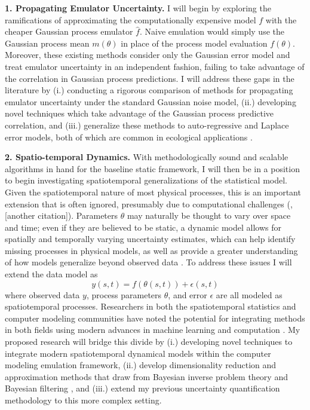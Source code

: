 \documentclass[12pt]{article}
\begin{document}
 \textbf{1. Propagating Emulator Uncertainty.} I will begin by exploring the ramifications of approximating the computationally expensive model $f$ with the  cheaper Gaussian process emulator $\hat{f}$. Naive emulation would simply use the Gaussian process mean $m(\theta)$ in place of the process model evaluation $f(\theta)$. Moreover, these existing methods consider only the Gaussian error model and treat emulator uncertainty in an independent fashion, failing to take advantage of the correlation in Gaussian process predictions. I will address these gaps in the literature by (i.) conducting a rigorous comparison of methods for propagating emulator uncertainty under the standard Gaussian noise model, (ii.) developing novel techniques which take advantage of the Gaussian process predictive correlation, and (iii.) generalize these methods to auto-regressive and Laplace error models, both of which 
are common in ecological applications \cite{Fer}. 

 \textbf{2. Spatio-temporal Dynamics.}
With methodologically sound and scalable algorithms in hand for the baseline static framework, I will then be in a position to begin investigating spatiotemporal generalizations of the statistical model. Given the spatiotemporal nature of most physical processes, this is an important extension that is often ignored, presumably due to computational challenges (\cite{Fer2}, [another citation]). Parameters $\theta$ may naturally be thought to vary over space
and time; even if they are believed to be static, a dynamic model allows for spatially and temporally varying uncertainty estimates, which can help identify 
missing processes in physical models, as well as provide a greater understanding of how models generalize beyond observed data \cite{Fer2, Dietze}. To address these issues I will extend the data model as 
  \[y(s, t) = f(\theta(s, t)) + \epsilon(s, t)\]
 where observed data $y$, process parameters $\theta$, and error $\epsilon$ are all modeled as spatiotemporal processes. Researchers in both the spatiotemporal statistics and computer modeling communities
have noted the potential for integrating methods in both fields using modern advances in machine learning and computation \cite{Wikle, Baker}. My proposed research will bridge this divide by (i.) developing novel techniques to integrate modern spatiotemporal dynamical models \cite{Wikle, Hefley}
within the computer modeling emulation framework, (ii.) develop dimensionality reduction and approximation methods that draw from Bayesian inverse problem 
theory \cite{Kugler} and Bayesian filtering \cite{Sarkka}, and (iii.) extend my previous uncertainty quantification methodology to this more complex setting. 
 
\end{document}

